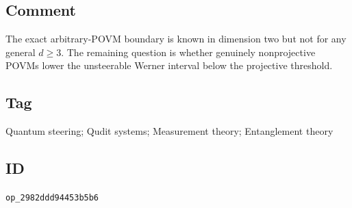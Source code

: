 \subsection*{Comment}

The exact arbitrary-POVM boundary is known in dimension two but not for any
general $d\geq3$.  The remaining question is whether genuinely
nonprojective POVMs lower the unsteerable Werner interval below the
projective threshold.

\subsection*{Tag}

Quantum steering; Qudit systems; Measurement theory; Entanglement theory

\subsection*{ID}

\texttt{op\_2982ddd94453b5b6}
